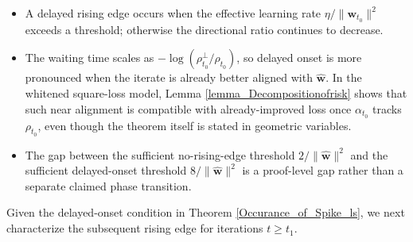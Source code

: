 \documentclass[pdflatex,sn-basic]{sn-jnl}%
\theoremstyle{thmstyleone}%
\begin{document}
\begin{itemize}
    \item A delayed rising edge occurs when the effective learning rate $\eta/\|\mathbf{w}_{t_0}\|^2$ exceeds a threshold; otherwise the directional ratio continues to decrease.
    \item The waiting time scales as $-\log (\rho_{t_0}^{\perp} / \rho_{t_0})$, so delayed onset is more pronounced when the iterate is already better aligned with $\hat{\mathbf{w}}$. In the whitened square-loss model, Lemma \ref{lemma_Decompositionofrisk} shows that such near alignment is compatible with already-improved loss once $\alpha_{t_0}$ tracks $\rho_{t_0}$, even though the theorem itself is stated in geometric variables.
    \item The gap between the sufficient no-rising-edge threshold $2/\|\hat{\mathbf{w}}\|^2$ and the sufficient delayed-onset threshold $8/\|\hat{\mathbf{w}}\|^2$ is a proof-level gap rather than a separate claimed phase transition.
\end{itemize}
Given the delayed-onset condition in Theorem \ref{Occurance_of_Spike_ls}, we next characterize the subsequent rising edge for iterations $t \ge t_1$.
\end{document}

